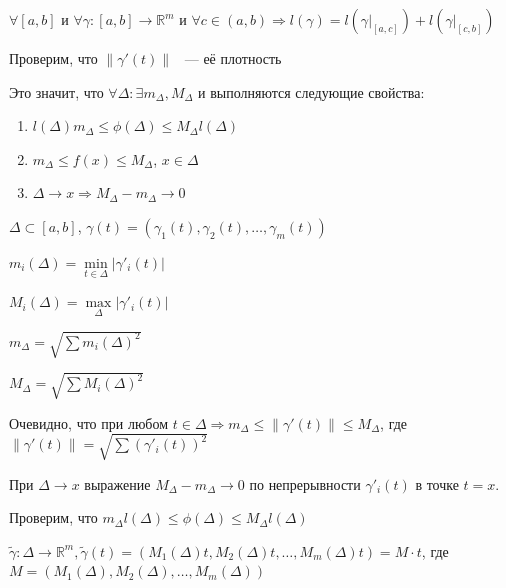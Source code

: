 \documentclass{article}
\begin{document}
            $\forall [a, b]$ и $\forall \gamma : [a, b] \rightarrow \mathbb{R}^m$ и $\forall c \in (a, b) \Longrightarrow l(\gamma) = l \left( \gamma|_{[a, c]} \right) + l \left( \gamma|_{[c, b]} \right)$
            
            Проверим, что $\| \gamma'(t) \|$ ~--- её плотность
            
            Это значит, что $\forall \Delta : \exists m_{\Delta}, M_{\Delta}$ и выполняются следующие свойства:
            
            \begin{enumerate}
            
                \item $l(\Delta) m_{\Delta} \leq \phi(\Delta) \leq M_{\Delta} l(\Delta)$
                
                \item $m_{\Delta} \leq f(x) \leq M_{\Delta}$, $x \in \Delta$
                
                \item $\Delta \rightarrow x \Longrightarrow M_{\Delta} - m_{\Delta} \rightarrow 0$
                
            \end{enumerate}
            
            $\Delta \subset [a, b]$, $\gamma(t) = (\gamma_1(t), \gamma_2(t), \ldots, \gamma_m(t))$
            
            $m_i(\Delta) = \min\limits_{t \in \Delta} | \gamma'_i(t) |$
            
            $M_i(\Delta) = \max\limits_{\Delta} |\gamma'_i(t) |$
            
            $m_{\Delta} = \sqrt{\sum m_i(\Delta)^2}$
            
            $M_{\Delta} = \sqrt{\sum M_i(\Delta)^2}$
            
            Очевидно, что при любом $t \in \Delta \Longrightarrow m_{\Delta} \leq \| \gamma'(t) \|  \leq M_{\Delta}$, где $\| \gamma'(t) \| = \sqrt{\sum(\gamma'_i(t))^2}$
            
            При $\Delta \rightarrow x$ выражение $M_{\Delta} - m_{\Delta} \rightarrow 0$ по непрерывности $\gamma'_i(t)$ в точке $t = x$.
            
            Проверим, что $m_{\Delta} l(\Delta) \leq \phi(\Delta) \leq M_{\Delta} l(\Delta)$
            
            $\widetilde{\gamma} : \Delta \rightarrow \mathbb{R}^m, \widetilde{\gamma}(t) = \left(M_1(\Delta)t, M_2(\Delta)t, \ldots, M_m(\Delta)t\right) = M \cdot t$, где $M = (M_1(\Delta), M_2(\Delta), \ldots, M_m(\Delta) )$
            
\end{document}
